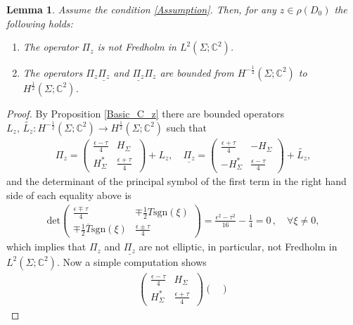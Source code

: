 \documentclass[11pt,a4paper,reqno,oneside]{amsproc}
\def \cc {{\mathbb C}}
\numberwithin{equation}{section}
\def \cc {{\mathbb{C}}}
\newtheorem{lemma}[definition]{Lemma}
\begin{document}
\begin{lemma}\label{Pi_notFredholm} Assume the condition \eqref{Assumption}. Then, for any $z\in\rho(D_0)$ the following holds:
\begin{enumerate}
\item[(i)]  The operator $\Pi_z$ is not Fredholm in $L^2(\Sigma;\cc^2)$. 
\item[(ii)] The operators $\Pi_z\underline{\Pi_z}$ and $\underline{\Pi_z}\Pi_z$ are bounded from $H^{-\frac{1}{2}}(\Sigma;\cc^2)$ to $H^{\frac{1}{2}}(\Sigma;\cc^2)$.
\end{enumerate}
\end{lemma}
\begin{proof} By Proposition \ref{Basic_C_z} there are bounded operators $L_z,\, \widetilde{L_z}: H^{-\frac{1}{2}}(\Sigma;\cc^2)\rightarrow H^{\frac{1}{2}}(\Sigma;\cc^2)$ such that
\begin{align*}
\Pi_z =  \begin{pmatrix} 
	      \frac{\epsilon -\tau}{4} & H_\Sigma\\ 
	H^*_\Sigma & \frac{\epsilon +\tau}{4}  \, 
	   \end{pmatrix}  + L_z, \quad  \underline{\Pi_z} =  \begin{pmatrix} 
	      \frac{\epsilon +\tau}{4} & -H_\Sigma\\ 
	-H^*_\Sigma & \frac{\epsilon-\tau}{4}  \, 
	   \end{pmatrix}  +\widetilde{L_z},
\end{align*}
and the determinant of the principal symbol of the first term in the right hand side of each equality above is
\begin{align*}
\mathrm{det}\begin{pmatrix} 
	      \frac{\epsilon \mp \tau}{4} & \mp\frac{1}{2}T \mathrm{sgn}(\xi)\\ 
	\mp \frac{1}{2}\overline{T} \mathrm{sgn}(\xi) & \frac{\epsilon \pm \tau}{4}  \, 
	   \end{pmatrix} = \frac{\epsilon^2-\tau^2}{16} -\frac{1}{4}=0 \, , \quad \forall \xi\neq0,
\end{align*}
which implies that $\Pi_z$ and  $\underline{\Pi_z}$ are not elliptic, in particular,  not Fredholm in $L^2(\Sigma;\cc^2)$.  Now a simple computation shows
\begin{align*}
 \begin{pmatrix} 
	      \frac{\epsilon -\tau}{4} & H_\Sigma\\ 
	H^*_\Sigma & \frac{\epsilon +\tau}{4}  \, 
	   \end{pmatrix}   \begin{pmatrix} 

\end{pmatrix}
\end{align*}
\end{proof}
\end{document}
